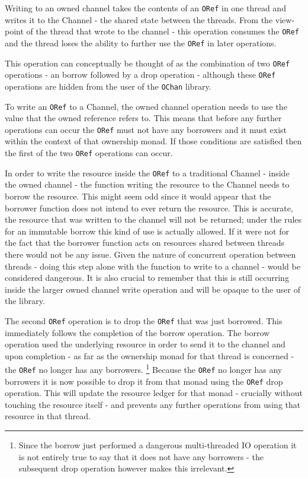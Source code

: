 \documentclass[onehalf,11pt]{beavtex}
\begin{document}
Writing to an owned channel takes the contents of an \texttt{ORef} in
one thread and writes it to the Channel - the shared state between the threads.
From the view-point of the thread that wrote to the channel - this operation
consumes the \texttt{ORef} and the thread loses the ability to further use the
\texttt{ORef} in later operations.

This operation can conceptually be thought of as the combination of two
\texttt{ORef} operations - an borrow followed by a drop operation -
although these \texttt{ORef} operations are hidden from the user of the
\texttt{OChan} library.

To write an \texttt{ORef} to a Channel, the owned channel operation
needs to use the value that the owned reference refers to.  This means
that before any further operations can occur the \texttt{ORef} must not have any
borrowers and it must exist within the context of that ownership monad.
If those conditions are satisfied then the first of the two \texttt{ORef}
operations can occur.

In order to write the resource inside the \texttt{ORef} to a traditional Channel
- inside the owned channel - the function writing the resource to the
Channel needs to borrow the resource.
This might seem odd since it would appear that the borrower function does not
intend to ever return the resource.  This is accurate, the resource that was
written to the channel will not be returned; under the rules for an immutable
borrow this kind of use is actually allowed.  If it were not for the fact that
the borrower function acts on resources shared between threads there would not be
any issue.  Given the nature of concurrent operation between threads - doing
this step alone with the function to write to a channel - would be considered
dangerous.  It is also crucial to remember that this is still occurring inside
the larger owned channel write operation and will be opaque to the user
of the library.

The second \texttt{ORef} operation is to drop the \texttt{ORef} that was just
borrowed. This immediately follows the completion of the borrow operation. The
borrow operation used the underlying resource in order to send it to the channel
and upon completion - as far as the ownership monad for that thread is
concerned - the \texttt{ORef} no longer has any borrowers.
\footnote{Since the borrow just performed a dangerous multi-threaded IO operation
  it is not entirely true to say that it does not have any borrowers - the
  subsequent drop operation however makes this irrelevant.}
Because the \texttt{ORef} no longer has any borrowers it is now possible to
drop it from that monad using the \texttt{ORef} drop operation.  This will
update the resource ledger for that monad - crucially without touching the
resource itself - and prevents any further operations from using that resource
in that thread.
\end{document}
